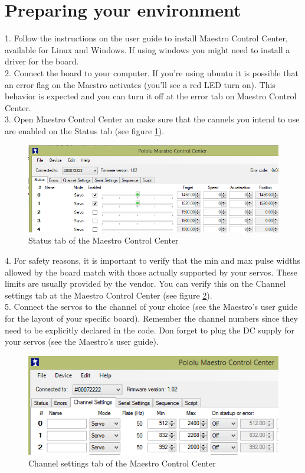\documentclass[letterpaper]{book}
\begin{document}
\section{Preparing your environment}
1. Follow the instructions on the user guide to install Maestro Control Center, available for Linux and Windows. If using windows you might need to install a driver for the board.\\
2. Connect the board to your computer. If you're using ubuntu it is possible that an error flag on the Maestro activates (you'll see a red LED turn on). This behavior is expected and you can turn it off at the error tab on Maestro Control Center.\\
3. Open Maestro Control Center an make sure that the cannels you intend to use are enabled on the Status tab (see figure \ref{fig:maestro1}).\\
\begin{figure}
\includegraphics[width=\textwidth]{images/maestro1.png}
\caption{Status tab of the Maestro Control Center}
\label{fig:maestro1}

\end{figure}
4. For safety reasons, it is important to verify that the min and max pulse widths allowed by the board match with those actually supported by your servos. These limits are usually provided by the vendor. You can verify this on the Channel settings tab at the Maestro Control Center (see figure \ref{fig:maestro2}).\\
5. Connect the servos to the channel of your choice (see the Maestro's user guide for the layout of your specific board). Remember the channel numbers since they need to be explicitly declared in the code. Don forget to plug the DC supply for your servos (see the Maestro's user guide).\\
\begin{figure}
\includegraphics{images/maestro2.png}
\caption{Channel settings tab of the Maestro Control
\label{fig:maestro2}
 Center}
\end{figure}
\end{document}
